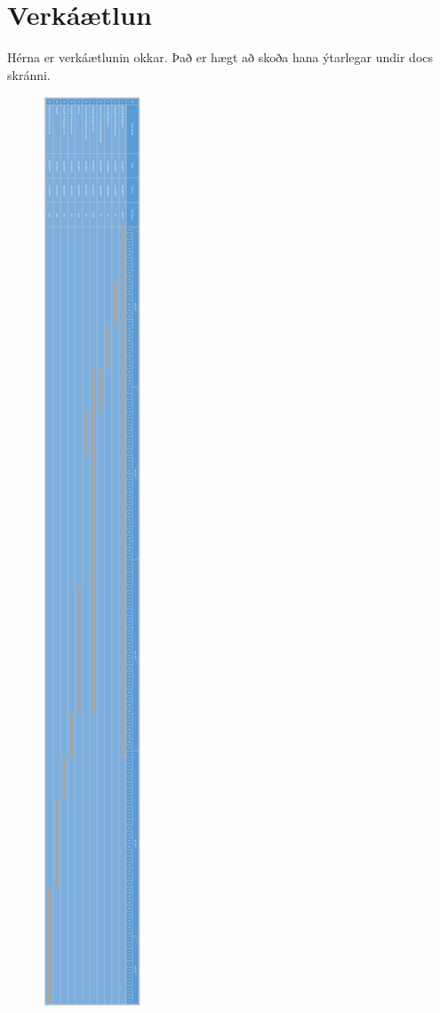 \section{Verkáætlun}
Hérna er verkáætlunin okkar. Það er hægt að skoða hana ýtarlegar undir docs skránni.

\begin{figure}[h]
\includegraphics[scale=.16]{img/gant_rit}
\end{figure}